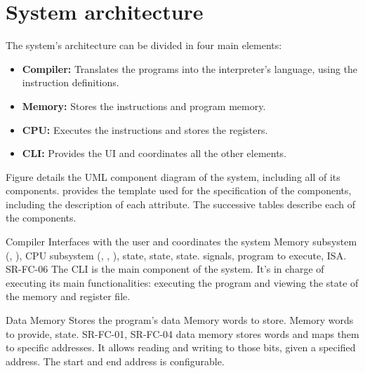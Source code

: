 \section{System architecture}\label{sec:architecture}
The system's architecture can be divided in four main elements:
\begin{itemize}
  \item \textbf{Compiler:} Translates the  programs into the \gls{interpreter}'s language, using the \gls{instruction} definitions.
  \item \textbf{Memory:} Stores the \glspl{instruction} and program memory.
  \item \textbf{\gls{CPU}:} Executes the \glspl{instruction} and stores the registers.
  \item \textbf{\gls{CLI}:} Provides the \gls{UI} and coordinates all the other elements.
\end{itemize}

Figure  details the UML component diagram \parencite{Cook2017} of the system, including all of its components.  provides the template used for the specification of the components, including the description of each attribute. The successive tables describe each of the components.




\begin{component}{Compiler}
  {Interfaces with the user and coordinates the system}  %
  {Memory subsystem (, ), CPU subsystem (, , ), }  %
  { state,  state,  state.}  %
  { signals, program to execute, \gls{ISA}.}  %
  {SR-FC-06}  %
  The \gls{CLI} is the main component of the system. It's in charge of executing its main functionalities: executing the program and viewing the state of the memory and register file.
\end{component}

\begin{component}{Data Memory}
  {Stores the program's data}  %
  {\NA}  %
  {Memory \glspl{word} to store.}  %
  {Memory \glspl{word} to provide, state.}  %
  {SR-FC-01, SR-FC-04}  %
  \Gls{data memory} stores \glspl{word} and maps them to specific addresses. It allows reading and writing to those bits, given a specified address. The start and end address is configurable.
\end{component}


